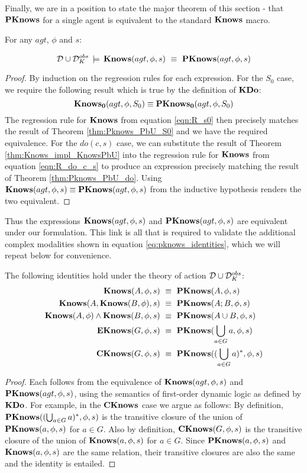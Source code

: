 Finally, we are in a position to state the major theorem of this section
- that $\mathbf{PKnows}$ for a single agent is equivalent to the standard
$\mathbf{Knows}$ macro.

\begin{thm}
For any $agt$, $\phi$ and $s$:

\[
\mathcal{D}\cup\mathcal{D}_{K}^{obs}\,\models\,\mathbf{Knows}(agt,\phi,s)\,\,\equiv\,\,\mathbf{PKnows}(agt,\phi,s)\]

\end{thm}
\begin{proof}
By induction on the regression rules for each expression. For the
$S_{0}$ case, we require the following result which is true by the
definition of $\mathbf{KDo}$:\[
\mathbf{Knows_{0}}(agt,\phi,S_{0})\equiv\mathbf{PKnows_{0}}(agt,\phi,S_{0})\]
 The regression rule for $\mathbf{Knows}$ from equation \eqref{eqn:R_s0}
then precisely matches the result of Theorem \ref{thm:Pknows_PbU_S0}
and we have the required equivalence. For the $do(c,s)$ case, we
can substitute the result of Theorem \ref{thm:Knows_impl_KnowsPbU}
into the regression rule for $\mathbf{Knows}$ from equation \eqref{eqn:R_do_c_s}
to produce an expression precisely matching the result of Theorem
\ref{thm:Pknows_PbU_do}. Using $\mathbf{Knows}(agt,\phi,s)\equiv\mathbf{PKnows}(agt,\phi,s)$
from the inductive hypothesis renders the two equivalent. 
\end{proof}
\medskip{}


Thus the expressions $\mathbf{Knows}(agt,\phi,s)$ and $\mathbf{PKnows}(agt,\phi,s)$
are equivalent under our formulation. This link is all that is required
to validate the additional complex modalities shown in equation \eqref{eq:pknows_identities},
which we will repeat below for convenience.

\begin{thm}
The following identities hold under the theory of action $\mathcal{D}\cup\mathcal{D}_{K}^{obs}$:\begin{align*}
\mathbf{Knows}(A,\phi,s) & \,\,\equiv\,\,\mathbf{PKnows}(A,\phi,s)\\
\mathbf{Knows}(A,\mathbf{Knows}(B,\phi),s) & \,\,\equiv\,\,\mathbf{PKnows}(A;B,\phi,s)\\
\mathbf{Knows}(A,\phi)\wedge\mathbf{Knows}(B,\phi,s) & \,\,\equiv\,\,\mathbf{PKnows}(A\cup B,\phi,s)\\
\mathbf{EKnows}(G,\phi,s) & \,\,\equiv\,\,\mathbf{PKnows}(\bigcup_{a\in G}a,\phi,s)\\
\mathbf{CKnows}(G,\phi,s) & \,\,\equiv\,\,\mathbf{PKnows}((\bigcup_{a\in G}a)^{*},\phi,s)\end{align*}

\end{thm}
\begin{proof}
Each follows from the equivalence of $\mathbf{Knows}(agt,\phi,s)$ and $\mathbf{PKnows}(agt,\phi,s)$,
using the semantics of first-order dynamic logic as defined by $\mathbf{KDo}$.
For example, in the $\mathbf{CKnows}$ case we argue as follows: By definition,
$\mathbf{PKnows}((\bigcup_{a\in G}a)^{*},\phi,s)$ is the transitive closure
of the union of $\mathbf{PKnows}(a,\phi,s)$ for $a\in G$. Also by definition,
$\mathbf{CKnows}(G,\phi,s)$ is the transitive closure of the union of $\mathbf{Knows}(a,\phi,s)$
for $a\in G$. Since $\mathbf{PKnows}(a,\phi,s)$ and $\mathbf{Knows}(a,\phi,s)$
are the same relation, their transitive closures are also the same
and the identity is entailed. 
\end{proof}

